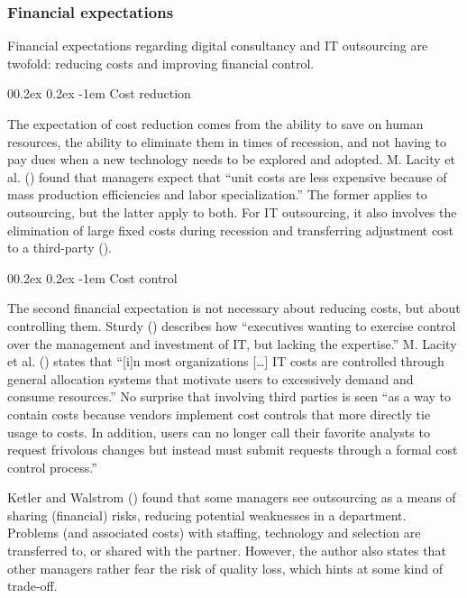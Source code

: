 \documentclass[
  man,floatsintext]{apa6}
\makeatletter
\let\oldparagraph\paragraph
\renewcommand{\paragraph}[1]{\oldparagraph{#1}\mbox{}}
\renewcommand{\paragraph}{\@startsection{paragraph}{4}{\parindent}%
  {0\baselineskip \@plus 0.2ex \@minus 0.2ex}%
  {-1em}%
  {\normalfont\normalsize\bfseries\itshape\typesectitle}}
\makeatother
\begin{document}
\subsubsection{Financial expectations}\label{financial-expectations}

Financial expectations regarding digital consultancy and IT outsourcing are twofold: reducing costs and improving financial control.

\paragraph{Cost reduction}\label{cost-reduction}

The expectation of cost reduction comes from the ability to save on human resources, the ability to eliminate them in times of recession, and not having to pay dues when a new technology needs to be explored and adopted. M. Lacity et al. () found that managers expect that ``unit costs are less expensive because of mass production efficiencies and labor specialization.'' The former applies to outsourcing, but the latter apply to both. For IT outsourcing, it also involves the elimination of large fixed costs during recession and transferring adjustment cost to a third-party ().

\paragraph{Cost control}\label{cost-control}

The second financial expectation is not necessary about reducing costs, but about controlling them. Sturdy () describes how ``executives wanting to exercise control over the management and investment of IT, but lacking the expertise.'' M. Lacity et al. () states that ``{[}i{]}n most organizations {[}\ldots{]} IT costs are controlled through general allocation systems that motivate users to excessively demand and consume resources.'' No surprise that involving third parties is seen ``as a way to contain costs because vendors implement cost controls that more directly tie usage to costs. In addition, users can no longer call their favorite analysts to request frivolous changes but instead must submit requests through a formal cost control process.''

Ketler and Walstrom () found that some managers see outsourcing as a means of sharing (financial) risks, reducing potential weaknesses in a department. Problems (and associated costs) with staffing, technology and selection are transferred to, or shared with the partner. However, the author also states that other managers rather fear the risk of quality loss, which hints at some kind of trade-off.
\end{document}
